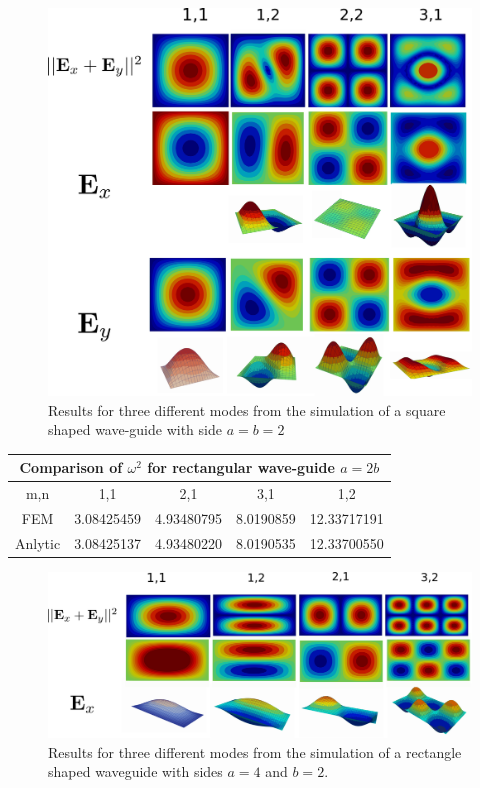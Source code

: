 \begin{figure}
\centering
\includegraphics[scale=0.1]{./img/square_waveguide.pdf}
\caption{Results for three different modes from the simulation of a square shaped wave-guide with side $a=b=2$}
\label{fig:square_waveguide}
\end{figure}

\begin{center}
\begin{tabular}{|c|c|c|c|c|}
\hline
\multicolumn{5}{|c|}{Comparison of $\omega^2$ for rectangular wave-guide $a =2b$} \\
\hline 
m,n & 1,1 & 2,1 & 3,1 & 1,2 \\ 
\hline 
FEM     & 3.08425459 & 4.93480795 & 8.0190859 & 12.33717191 \\ 
\hline 
Anlytic & 3.08425137 & 4.93480220 & 8.0190535 & 12.33700550 \\ 
\hline 
\end{tabular} 
\label{tab:rec_wav_comparison}
\end{center}
\begin{figure}
\centering
\includegraphics[scale=0.1]{./img/rectangular_waveguide.pdf}
\caption{Results for three different modes from the simulation of a rectangle shaped waveguide with sides $a=4$ and $b=2$.}
\label{fig:rectangular_waveguide}
\end{figure}


